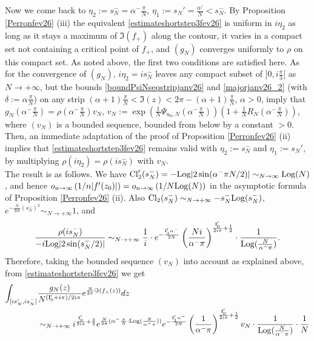 \documentclass[11pt]{amsart}
\newcommand{\Log}{{\rm Log}}
\begin{document}
{Now we come back to $\eta_2:=s_N^- = \textstyle \alpha^-\frac{\pi}{N}$, $\eta_1 := s_N'=\textstyle \frac{\alpha'}{N}< s_N^-$. By Proposition \ref{Perronfev26} (iii) the equivalent \eqref{estimateshortstep3fev26} is uniform in $i\eta_2$ as long as it stays a maximum of $\Im(f_+)$ along the contour, it varies in a compact set not containing a critical point of $f_+$, and $(g_N)$ converges uniformly to $\rho$ on this compact set. As noted above, the first two conditions are satisfied here. As for the convergence of $(g_N)$, $i\eta_2=is_N^-$ leaves any compact subset of $\textstyle ]0,i\frac{\pi}{3}[$ as $N\to +\infty$, but the bounds \eqref{boundPsiNseqstripjanv26} and \eqref{majorjanv26_2} (with $\delta:=\alpha\textstyle \frac{\pi}{N}$) on any strip $\textstyle (\alpha+1)\frac{\pi}{N}< \mathfrak{I}(z)< 2\pi-(\alpha+1)\frac{\pi}{N}$, $\alpha>0$, imply that $g_N(\textstyle \alpha^-\frac{\pi}{N}) = \rho(\textstyle \alpha^-\frac{\pi}{N})v_N$, $\textstyle v_N:= \exp\left(\frac{1}{N}{\Psi_{u_0,N}(\alpha^-\frac{\pi}{N})}\right)\textstyle (1 + \frac{1}{N}R_N(\alpha^-\frac{\pi}{N}))$, where $(v_N)$ is a bounded sequence, bounded from below by a constant $>0$. Then, an immediate adaptation of the proof of Proposition \ref{Perronfev26} (ii) implies that \eqref{estimateshortstep3fev26} remains valid with $\eta_2:=s_N^-$ and $\eta_1 := s_N'$, by multiplying $\rho(i\eta_2)=\rho(is_N^-)$ with $v_N$.\\
The result is as follows. We have ${\rm Cl}_2'(s_N^-) = -\Log\vert 2\sin(\alpha^-\pi N/2)\vert \sim_{N\to \infty} \Log(N)$, and hence $\textstyle o_{n \to \infty}\left(1/n\vert f'(z_0)\vert \right) = o_{n \to \infty}\left(1/N\Log(N)\right)$ in the asymptotic formula of Proposition \ref{Perronfev26} (ii). Also ${\rm Cl}_2(s_N^-)\sim_{N\to +\infty} -s_N^-\Log(s_N^-)$, $e^{-\frac{N}{2i\pi} (s_N^-)^2}\sim_{N\to +\infty} 1$, and
$$\frac{\rho(is_N^-) }{-i\Log\vert 2\sin(s_N^-/2)\vert} \sim_{N\to +\infty} 
\frac{1}{i}\cdot e^{-\frac{{\bf l}_1'\alpha^-}{2N}}\left(\frac{Ni}{\alpha^-\pi}\right)^{\frac{{\bf l}_0'}{2i\pi}+\frac{1}{2}}\cdot \frac{1}{\Log(\frac{N}{\alpha^-\pi})}.$$
Therefore, taking the bounded sequence $(v_N)$ into account as explained above, from \eqref{estimateshortstep3fev26} we get
\begin{align}
\int_{[is_N',is_N^-]} & \frac{g_N(z)}{N^{({\bf l}_0'+i\pi)/2i\pi}} e^{\frac{N}{2\pi}\Im(f_+(z))}dz \notag \\ & \sim_{N\to +\infty} i^{\frac{{\bf l}_0'}{2i\pi}+\frac{3}{2}}e^{\frac{N}{2\pi}(\alpha^-\frac{\pi}{N}\cdot \Log(\frac{N}{\alpha^-\pi}))} e^{-\frac{{\bf l}_1'\alpha^-}{2N}}\left(\frac{1}{\alpha^-\pi}\right)^{\frac{{\bf l}_0'}{2i\pi}+\frac{1}{2}}v_N\cdot \frac{1}{\Log(\frac{N}{\alpha^-\pi})}\cdot \dfrac{1}{N}

\end{align}}
\end{document}
